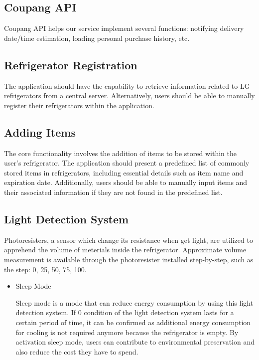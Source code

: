 \documentclass[conference]{IEEEtran}
\begin{document}
\subsection{Coupang API}
Coupang API helps our service implement several functions: notifying delivery date/time estimation, loading personal purchase history, etc.


\subsection{Refrigerator Registration}
The application should have the capability to retrieve information related to LG refrigerators from a central server. Alternatively, users should be able to manually register their refrigerators within the application.

\subsection{Adding Items}
The core functionality involves the addition of items to be stored within the user's refrigerator. The application should present a predefined list of commonly stored items in refrigerators, including essential details such as item name and expiration date. Additionally, users should be able to manually input items and their associated information if they are not found in the predefined list.

\subsection{Light Detection System}
Photoresisters, a sensor which change its resistance when get light, are utilized to apprehend the volume of meterials inside the refrigerator. Approximate volume measurement is available through the photoresister installed step-by-step, such as the step: 0, 25, 50, 75, 100.
\begin{itemize}
    \item Sleep Mode\par
    Sleep mode is a mode that can reduce energy consumption by using this light detection system. If 0 condition of the light detection system lasts for a certain period of time, it can be confirmed as additional energy consumption for cooling is not required anymore because the refrigerator is empty. By activation sleep mode, users can contribute to environmental preservation and also reduce the cost they have to spend.

\end{itemize}
\end{document}
